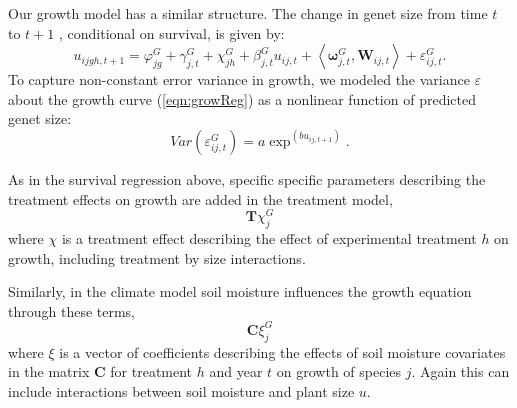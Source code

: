 \documentclass[11pt]{article}
\begin{document}
\begin{doublespacing}
Our growth model has a similar structure. The change in genet size from time $t$ to $t+1$ , conditional on survival, is given by:
\begin{equation}
u_{ijgh,t+1} = \varphi_{jg}^G + \gamma_{j,t}^G + \chi_{jh}^G  + \beta_{j,t}^G u_{ij,t} + 
\left \langle  \boldsymbol{\omega}_{j,t}^G, \boldsymbol{W}_{ij,t} \right \rangle + \varepsilon_{ij,t}^G .
\label{eqn:growReg}
\end{equation}
To capture non-constant error variance in growth, we modeled the variance $\varepsilon$  about the growth curve (\ref{eqn:growReg})  as a nonlinear function of predicted genet size:
\begin{equation}
Var(\varepsilon_{ij,t}^G) = a \exp ^{(bu_{ij,t+1})} .
\label{eqn:growVar}
\end{equation}

As in the survival regression above, specific specific parameters describing the treatment effects on growth are added in the treatment model, 
\begin{equation}
\boldsymbol{T}\chi_{j}^G 
\label{eqn:growT}
\end{equation}
where $\chi$ is a treatment effect describing the effect of experimental treatment $h$ on growth, including treatment by size interactions.

Similarly, in the climate model soil moisture influences the growth equation through these terms,  
\begin{equation}
\boldsymbol{C}\xi_{j}^G 
\label{eqn:growC}
\end{equation}
where $\xi$ is a vector of coefficients describing the effects of soil moisture covariates in the matrix $\boldsymbol{C}$ for treatment $h$ and year $t$ on growth of species $j$. Again this can include interactions between soil moisture and plant size $u$.


\end{doublespacing}
\end{document}
